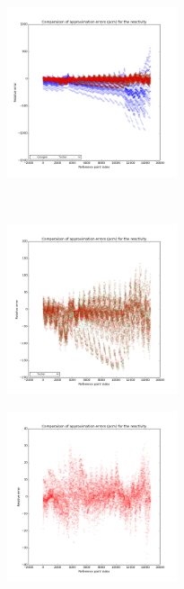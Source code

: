 \begin{center}
\begin{figure}[!h]\ContinuedFloat
		\centering
		\begin{subfigure}[b]{0.45\textwidth}
		\includegraphics[width=\linewidth,height=5cm]{images/UOX/ReactivityError_with_cocagne.png}
\end{subfigure}
~
\begin{subfigure}[b]{0.45\textwidth}
		\includegraphics[width=\linewidth,height=5cm]{images/UOX/ReactivityError.png}
		\end{subfigure}
		\begin{subfigure}[b]{0.45\textwidth}
		\includegraphics[width=\linewidth,height=5cm]{images/UOX/ReactivityError_alone.png}
		\end{subfigure}
\end{figure}


\end{center}
